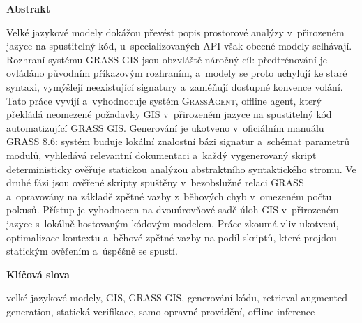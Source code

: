 \begin{center}
{\huge\bfseries{Abstrakt} \par}
\bigskip
\end{center}
Velké jazykové modely dokážou převést popis prostorové analýzy v~přirozeném jazyce na spustitelný kód, u~specializovaných API však obecné modely selhávají. Rozhraní systému GRASS GIS jsou obzvláště náročný cíl: předtrénování je ovládáno původním příkazovým rozhraním, a~modely se proto uchylují ke staré syntaxi, vymýšlejí neexistující signatury a~zaměňují dostupné konvence volání. Tato práce vyvíjí a~vyhodnocuje systém \textsc{GrassAgent}, offline agent, který překládá neomezené požadavky GIS v~přirozeném jazyce na spustitelný kód automatizující GRASS GIS. Generování je ukotveno v~oficiálním manuálu GRASS 8.6: systém buduje lokální znalostní bázi signatur a~schémat parametrů modulů, vyhledává relevantní dokumentaci a~každý vygenerovaný skript deterministicky ověřuje statickou analýzou abstraktního syntaktického stromu. Ve druhé fázi jsou ověřené skripty spuštěny v~bezobslužné relaci GRASS a~opravovány na základě zpětné vazby z~běhových chyb v~omezeném počtu pokusů. Přístup je vyhodnocen na dvouúrovňové sadě úloh GIS v~přirozeném jazyce s~lokálně hostovaným kódovým modelem. Práce zkoumá vliv ukotvení, optimalizace kontextu a~běhové zpětné vazby na podíl skriptů, které projdou statickým ověřením a~úspěšně se spustí.

\begin{center}
{\large\bfseries{Klíčová slova} \par}
\bigskip
\end{center}
\noindent velké jazykové modely, GIS, GRASS GIS, generování kódu, retrieval-augmented generation, statická verifikace, samo-opravné provádění, offline inference

\vfil\vfil\vfil\null
\clearpage
